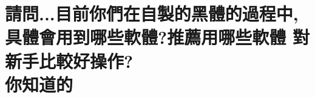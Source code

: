 %
% 

\chapter[請問...目前你們在自製的黑體的過程中, 具體會用到哪些軟體?推薦用哪些軟體 對新手比較好操作? 你知道的]{請問...目前你們在自製的黑體的過程中, \\[0.35em] 具體會用到哪些軟體?推薦用哪些軟體 對新手比較好操作? \\[0.35em] 你知道的}


